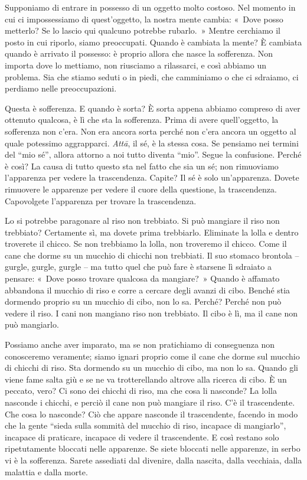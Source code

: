 Supponiamo di entrare in possesso di un oggetto molto costoso. Nel
momento in cui ci impossessiamo di quest'oggetto, la nostra mente
cambia: «~Dove posso metterlo? Se lo lascio qui qualcuno potrebbe
rubarlo.~» Mentre cerchiamo il posto in cui riporlo, siamo preoccupati.
Quando è cambiata la mente? È cambiata quando è arrivato il possesso: è
proprio allora che nasce la sofferenza. Non importa dove lo mettiamo,
non riusciamo a rilassarci, e così abbiamo un problema. Sia che stiamo
seduti o in piedi, che camminiamo o che ci sdraiamo, ci perdiamo nelle
preoccupazioni.

Questa è sofferenza. E quando è sorta? È sorta appena abbiamo compreso
di aver ottenuto qualcosa, è lì che sta la sofferenza. Prima di avere
quell'oggetto, la sofferenza non c'era. Non era ancora sorta perché non
c'era ancora un oggetto al quale potessimo aggrapparci. \emph{Attā}, il
sé, è la stessa cosa. Se pensiamo nei termini del ``mio sé'', allora
attorno a noi tutto diventa ``mio''. Segue la confusione. Perché è così?
La causa di tutto questo sta nel fatto che sia un sé; non rimuoviamo
l'apparenza per vedere la trascendenza. Capite? Il sé è solo
un'apparenza. Dovete rimuovere le apparenze per vedere il cuore della
questione, la trascendenza. Capovolgete l'apparenza per trovare la
trascendenza.

Lo si potrebbe paragonare al riso non trebbiato. Si può mangiare il riso
non trebbiato? Certamente sì, ma dovete prima trebbiarlo. Eliminate la
lolla e dentro troverete il chicco. Se non trebbiamo la lolla, non
troveremo il chicco. Come il cane che dorme su un mucchio di chicchi non
trebbiati. Il suo stomaco brontola -- gurgle, gurgle, gurgle -- ma tutto
quel che può fare è starsene lì sdraiato a pensare: «~Dove posso trovare
qualcosa da mangiare?~» Quando è affamato abbandona il mucchio di riso e
corre a cercare degli avanzi di cibo. Benché stia dormendo proprio su un
mucchio di cibo, non lo sa. Perché? Perché non può vedere il riso. I
cani non mangiano riso non trebbiato. Il cibo è lì, ma il cane non può
mangiarlo.

Possiamo anche aver imparato, ma se non pratichiamo di conseguenza non
conosceremo veramente; siamo ignari proprio come il cane che dorme sul
mucchio di chicchi di riso. Sta dormendo su un mucchio di cibo, ma non
lo sa. Quando gli viene fame salta giù e se ne va trotterellando altrove
alla ricerca di cibo. È un peccato, vero? Ci sono dei chicchi di riso,
ma che cosa li nasconde? La lolla nasconde i chicchi, e perciò il cane
non può mangiare il riso. C'è il trascendente. Che cosa lo nasconde? Ciò
che appare nasconde il trascendente, facendo in modo che la gente
``sieda sulla sommità del mucchio di riso, incapace di mangiarlo'',
incapace di praticare, incapace di vedere il trascendente. E così
restano solo ripetutamente bloccati nelle apparenze. Se siete bloccati
nelle apparenze, in serbo vi è la sofferenza. Sarete assediati dal
divenire, dalla nascita, dalla vecchiaia, dalla malattia e dalla morte.

